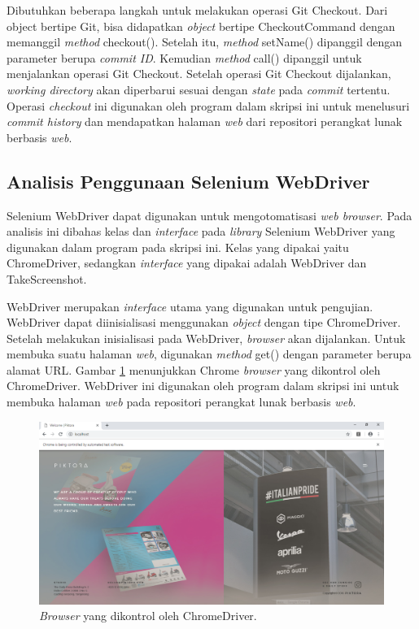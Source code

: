 Dibutuhkan beberapa langkah untuk melakukan operasi Git Checkout. Dari object bertipe Git, bisa  didapatkan \textit{object} bertipe CheckoutCommand dengan memanggil \textit{method} checkout(). Setelah itu, \textit{method} setName() dipanggil dengan parameter berupa \textit{commit ID}. Kemudian \textit{method} call() dipanggil untuk menjalankan operasi Git Checkout. Setelah operasi Git Checkout dijalankan, \textit{working directory} akan diperbarui sesuai dengan \textit{state} pada \textit{commit} tertentu. Operasi \textit{checkout} ini digunakan oleh program dalam skripsi ini untuk menelusuri \textit{commit history} dan mendapatkan halaman \textit{web} dari repositori perangkat lunak berbasis \textit{web}.    


\subsection{Analisis Penggunaan Selenium WebDriver}
\label{subsec:analisis_selenium}
Selenium WebDriver dapat digunakan untuk mengotomatisasi \textit{web browser}. Pada analisis ini dibahas kelas dan \textit{interface} pada \textit{library} Selenium WebDriver yang digunakan dalam program pada skripsi ini. 
Kelas yang dipakai yaitu ChromeDriver, sedangkan \textit{interface} yang dipakai adalah WebDriver dan TakeScreenshot. 


WebDriver merupakan \textit{interface} utama yang digunakan untuk pengujian. WebDriver dapat diinisialisasi menggunakan \textit{object} dengan tipe ChromeDriver. Setelah melakukan inisialisasi pada WebDriver, \textit{browser} akan dijalankan. Untuk membuka suatu halaman \textit{web}, digunakan \textit{method} get() dengan parameter berupa alamat URL. Gambar \ref{fig:webdriver} menunjukkan Chrome \textit{browser} yang dikontrol oleh ChromeDriver. WebDriver ini digunakan oleh program dalam skripsi ini untuk membuka halaman \textit{web} pada repositori perangkat lunak berbasis \textit{web}. 

\begin{figure}[H]
	\centering
		\includegraphics[scale=0.4]{Gambar/ChromeDriver.png}
	\caption{\textit{Browser} yang dikontrol oleh ChromeDriver.}
	\label{fig:webdriver}
\end{figure}


